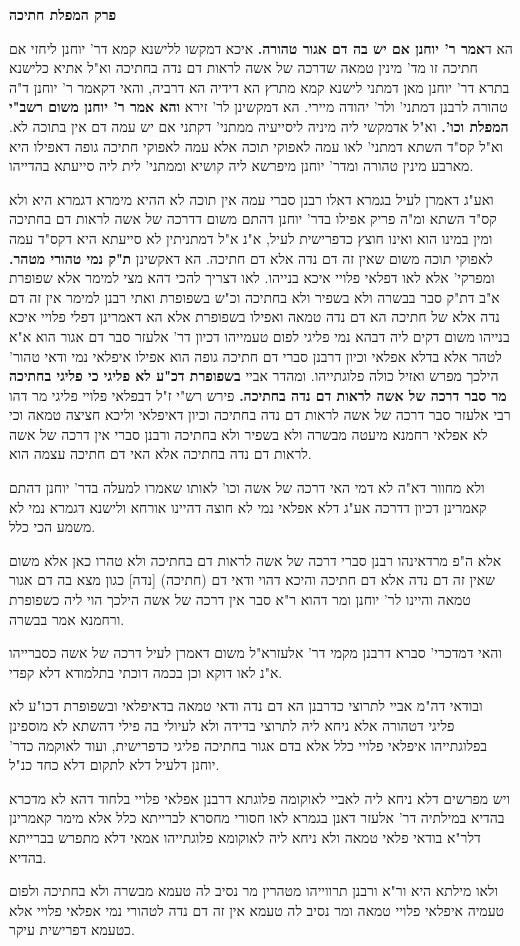 \documentclass[12pt, openany]{book}
\newcommand{\sethebfont}{
\fontsize{10.5pt}{21.0pt} \selectfont
}
\newcommand{\twocol}[1]{
	{\sethebfont \begin{multicols}{2}
			#1
	\end{multicols}}	
}
\newcommand{\chapname}{}
\newcommand{\newchap}[1]{
	\addcontentsline{toc}{chapter}{#1}
	\renewcommand{\chapname}{#1}
		\begin{center}
			\textbf{%
\fontsize{16pt}{16pt}\selectfont
				#1}
		\end{center}
}
\begin{document}
\newchap{פרק \quad המפלת חתיכה}
\twocol{
 הא ד\textbf{אמר ר' יוחנן אם יש בה דם אגור טהורה.}  איכא דמקשו ללישנא קמא דר' יוחנן ליחזי אם חתיכה זו מד' מינין טמאה שדרכה של אשה לראות דם נדה בחתיכה וא"ל אתיא כלישנא בתרא דר' יוחנן מאן דמתני לישנא קמא מתרץ הא דידיה הא דרביה, והאי דקאמר ר' יוחנן ד"ה טהורה לרבנן דמתני' ולר' יהודה מיירי. 
 הא דמקשינן לר' זירא \textbf{והא אמר ר' יוחנן משום רשב"י המפלת וכו'.}  וא"ל אדמקשי ליה מיניה ליסייעיה ממתני' דקתני אם יש עמה דם אין בתוכה לא. וא"ל קס"ד השתא דמתני' לאו עמה לאפוקי תוכה אלא עמה לאפוקי חתיכה גופה דאפילו היא מארבע מינין טהורה ומדר' יוחנן מיפרשא ליה קושיא וממתני' לית ליה סייעתא בהדייהו.\par  ואע"ג דאמרן לעיל בגמרא דאלו רבנן סברי עמה אין תוכה לא ההיא מימרא דגמרא היא ולא קס"ד השתא ומ"ה פריק אפילו בדר' יוחנן דהתם משום דדרכה של אשה לראות דם בחתיכה ומין במינו הוא ואינו חוצץ כדפרישית לעיל, א"נ א"ל דמתניתין לא סייעתא היא דקס"ד עמה לאפוקי תוכה משום שאין זה דם נדה אלא דם חתיכה. 
 הא דאקשינן \textbf{ת"ק נמי טהורי מטהר.}  ומפרקי' אלא לאו דפלאי פלויי איכא בנייהו. לאו דצריך להכי דהא מצי למימר אלא שפופרת א"ב דת"ק סבר בבשרה ולא בשפיר ולא בחתיכה וכ"ש בשפופרת ואתי רבנן למימר אין זה דם נדה אלא של חתיכה הא דם נדה טמאה ואפילו בשפופרת אלא הא דאמרינן דפלי פלויי איכא בנייהו משום דקים ליה דבהא נמי פליגי לפום טעמייהו דכיון דר' אלעזר סבר דם אגור הוא א"א לטהר אלא בדלא אפלאי וכיון דרבנן סברי דם חתיכה גופה הוא אפילו איפלאי נמי ודאי טהור' הילכך מפרש ואזיל כולה פלוגתייהו. 
 ומהדר אביי \textbf{בשפופרת דכ"ע לא פליגי כי פליגי בחתיכה מר סבר דרכה של אשה לראות דם נדה בחתיכה.}  פירש רש"י ז"ל דבפלאי פלויי פליגי מר דהו רבי אלעזר סבר דרכה של אשה לראות דם נדה בחתיכה וכיון דאיפלאי וליכא חציצה טמאה וכי לא אפלאי רחמנא מיעטה מבשרה ולא בשפיר ולא בחתיכה ורבנן סברי אין דרכה של אשה לראות דם נדה בחתיכה אלא האי דם חתיכה עצמה הוא.\par ולא מחוור דא"ה לא דמי האי דרכה של אשה וכו' לאותו שאמרו למעלה בדר' יוחנן דהתם קאמרינן דכיון דדרכה אע"ג דלא אפלאי נמי לא חוצה דהיינו אורחא ולישנא דגמרא נמי לא משמע הכי כלל.\par אלא ה"פ מרדאינהו רבנן סברי דרכה של אשה לראות דם בחתיכה ולא טהרו כאן אלא משום שאין זה דם נדה אלא דם חתיכה והיכא דהוי ודאי דם (חתיכה) [נדה] כגון מצא בה דם אגור טמאה והיינו לר' יוחנן ומר דהוא ר"א סבר אין דרכה של אשה הילכך הוי ליה כשפופרת ורחמנא אמר בבשרה.\par והאי דמדכרי' סברא דרבנן מקמי דר' אלעזרא"ל משום דאמרן לעיל דרכה של אשה כסברייהו א"נ לאו דוקא וכן בכמה דוכתי בתלמודא דלא קפדי.\par  ובודאי דה"מ אביי לתרוצי כדרבנן הא דם נדה ודאי טמאה בדאיפלאי ובשפופרת דכו"ע לא פליגי דטהורה אלא ניחא ליה לתרוצי בדידה ולא לעיולי בה פילי דהשתא לא מוספינן בפלוגתייהו איפלאי פלויי כלל אלא בדם אגור בחתיכה פליגי כדפרישית, ועוד לאוקמה כדר' יוחנן דלעיל דלא לתקום דלא כחד כנ"ל.\par ויש מפרשים דלא ניחא ליה לאביי לאוקומה פלוגתא דרבנן אפלאי פלויי בלחוד דהא לא מדכרא בהדיא במילתיה דר' אלעזר דאנן בגמרא לאו חסורי מחסרא לברייתא כלל אלא מימר קאמרינן דלר"א בודאי פלאי טמאה ולא ניחא ליה לאוקומא פלוגתייהו אמאי דלא מתפרש בברייתא בהדיא.\par  ולאו מילתא היא ור"א ורבנן תרווייהו מטהרין מר נסיב לה טעמא מבשרה ולא בחתיכה ולפום טעמיה איפלאי פלויי טמאה ומר נסיב לה טעמא אין זה דם נדה לטהורי נמי אפלאי פלויי אלא כטעמא דפרישית עיקר. }
\end{document}
